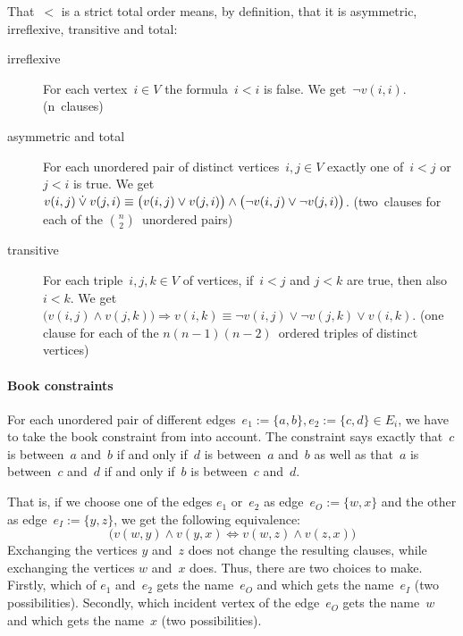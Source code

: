 That~$<$ is a strict total order means, by definition, that it is asymmetric, irreflexive, transitive
and total:

\begin{description}
\item[irreflexive] For each vertex~$i \in V$ the formula~$i < i$ is false. 
We get~$\lnot v(i, i)$. (n~clauses)
\item[asymmetric and total] For each unordered pair of distinct vertices~$i, j \in V$ exactly one
of~$i < j$ or~$j < i$ is true. We get~$v(i,j) \mathbin{\dot\vee} v(j,i) \equiv \bigl(v(i,j) \lor v(j,i)\bigr) \land \bigl(\lnot v(i,j) \lor \lnot v(j,i)\bigr)$. (two~clauses for each of the $\binom{n}{2}$~unordered pairs)
\item[transitive] For each triple~$i, j, k \in V$ of vertices, if~$i < j$ and $j < k$ are
true, then also~$i < k$. We get~$\bigl(v(i, j) \land v(j, k)\bigr) \Rightarrow v(i, k) \equiv \lnot v(i, j)
\lor \lnot v(j, k) \lor v(i, k)$. (one clause for each of the $n(n-1)(n-2)$~ordered triples of
distinct vertices)
\end{description}

\paragraph{Book constraints}

For each unordered pair of different edges~$e_1 := \{a, b\}, e_2 := \{c, d\} \in E_i$, we have to take the book 
constraint from  into account. The constraint says exactly that~$c$ is between~$a$
and~$b$ if and only if~$d$ is between~$a$ and~$b$ as well as that~$a$ is between~$c$ and~$d$
if and only if~$b$ is between~$c$ and~$d$. 


That is, if we choose one of the edges $e_1$ or~$e_2$ as edge~$e_O := \{w, x\}$ and the other as
edge~$e_I := \{y, z\}$, we get the following equivalence:
\[
\bigl(v(w, y) \land v(y, x) \Leftrightarrow v(w, z) \land v(z, x)\bigr) \tag{1}
\]
Exchanging the vertices $y$ and~$z$ does not change the resulting clauses, while
exchanging the vertices $w$ and~$x$ does. Thus, there are two choices to make. Firstly,
which of $e_1$ and~$e_2$ gets the name~$e_O$ and which gets the
name~$e_I$ (two possibilities). Secondly, which incident vertex of the edge~$e_O$ gets the
name~$w$ and which gets the name~$x$ (two possibilities).

